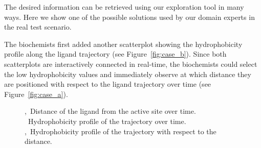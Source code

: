 \documentclass[twocolumn]{bmcart}%
\begin{document}
The desired information can be retrieved using our exploration tool in many ways.
Here we show one of the possible solutions used by our domain experts in the real test scenario.

The biochemists first added another scatterplot showing the hydrophobicity profile along the ligand trajectory (see Figure~\ref{fig:case_b}).
Since both scatterplots are interactively connected in real-time, the biochemists could select the low hydrophobicity values and immediately observe at which distance they are positioned with respect to the ligand trajectory over time  (see Figure~\ref{fig:case_a}). 

\begin{figure}[htb]
	\centering
  \caption{
  ,~Distance of the ligand from the active site over time. 
  ~Hydrophobicity profile of the trajectory over time.
  ,~Hydrophobicity profile of the trajectory with respect to the distance.
  }
\end{figure} 
\end{document}

